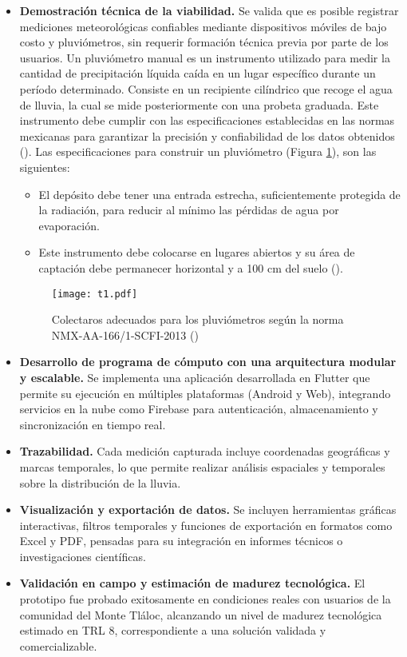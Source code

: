 \begin{itemize}
  \item \textbf{Demostración técnica de la viabilidad.} Se valida que es posible registrar mediciones meteorológicas confiables mediante dispositivos móviles de bajo costo y pluviómetros, sin requerir formación técnica previa por parte de los usuarios. Un pluviómetro manual es un instrumento utilizado para medir la cantidad de precipitación líquida caída en un lugar específico durante un período determinado. Consiste en un recipiente cilíndrico que recoge el agua de lluvia, la cual se mide posteriormente con una probeta graduada. Este instrumento debe cumplir con las especificaciones establecidas en las normas mexicanas para garantizar la precisión y confiabilidad de los datos obtenidos (\cite{semarnat_pluviometro}). Las especificaciones para construir un pluviómetro (Figura \ref{t1}), son las siguientes:
\begin{itemize}
    \item El depósito debe tener una entrada estrecha, suficientemente protegida de la radiación, para reducir al mínimo las pérdidas de agua por evaporación.
    \item Este instrumento debe colocarse en lugares abiertos y su área de captación debe permanecer horizontal y a 100 cm del suelo (\cite{se2013}).
\end{itemize}

\begin{figure}[h!]
\centering
  \texttt{[image: t1.pdf]}
  \caption{Colectaros adecuados para los pluviómetros según la norma NMX-AA-166/1-SCFI-2013 (\cite{se2013})}
  \label{t1}
\end{figure}
  
  \item \textbf{Desarrollo de programa de cómputo con una arquitectura modular y escalable.} Se implementa una aplicación desarrollada en Flutter que permite su ejecución en múltiples plataformas (Android y Web), integrando servicios en la nube como Firebase para autenticación, almacenamiento y sincronización en tiempo real.
  
  \item \textbf{Trazabilidad.} Cada medición capturada incluye coordenadas geográficas y marcas temporales, lo que permite realizar análisis espaciales y temporales sobre la distribución de la lluvia.
  
  \item \textbf{Visualización y exportación de datos.} Se incluyen herramientas gráficas interactivas, filtros temporales y funciones de exportación en formatos como Excel y PDF, pensadas para su integración en informes técnicos o investigaciones científicas.
  
  \item \textbf{Validación en campo y estimación de madurez tecnológica.} El prototipo fue probado exitosamente en condiciones reales con usuarios de la comunidad del Monte Tláloc, alcanzando un nivel de madurez tecnológica estimado en TRL 8, correspondiente a una solución validada y comercializable.
\end{itemize}

